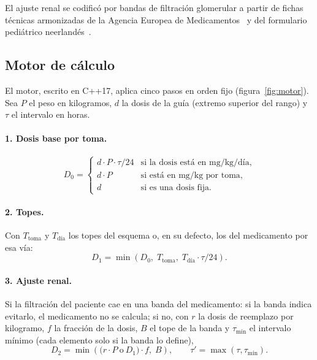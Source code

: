 \documentclass[11pt,a4paper]{article}
\begin{document}
El ajuste renal se codificó por bandas de filtración glomerular a partir de fichas técnicas armonizadas de la Agencia Europea de Medicamentos~\citep{emaamoxil} y del formulario pediátrico neerlandés~\citep{kinderformularium}.

\subsection{Motor de cálculo}

El motor, escrito en C++17, aplica cinco pasos en orden fijo (figura~\ref{fig:motor}). Sea $P$ el peso en kilogramos, $d$ la dosis de la guía (extremo superior del rango) y $\tau$ el intervalo en horas.

\paragraph{1. Dosis base por toma.}
\begin{equation}
D_0 =
\begin{cases}
d \cdot P \cdot \tau / 24 & \text{si la dosis está en mg/kg/día},\\
d \cdot P & \text{si está en mg/kg por toma},\\
d & \text{si es una dosis fija.}
\end{cases}
\end{equation}

\paragraph{2. Topes.} Con $T_{\text{toma}}$ y $T_{\text{día}}$ los topes del esquema o, en su defecto, los del medicamento por esa vía:
\begin{equation}
D_1 = \min\!\left(D_0,\; T_{\text{toma}},\; T_{\text{día}} \cdot \tau/24\right).
\end{equation}

\paragraph{3. Ajuste renal.} Si la filtración del paciente cae en una banda del medicamento: si la banda indica evitarlo, el medicamento no se calcula; si no, con $r$ la dosis de reemplazo por kilogramo, $f$ la fracción de la dosis, $B$ el tope de la banda y $\tau_{\min}$ el intervalo mínimo (cada elemento solo si la banda lo define),
\begin{equation}
D_2 = \min\!\left(\big(r \cdot P \ \text{o}\ D_1\big)\cdot f,\; B\right), \qquad \tau' = \max(\tau, \tau_{\min}).
\end{equation}
\end{document}

